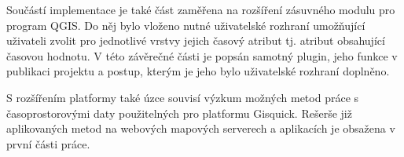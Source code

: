 Součástí implementace je také část zaměřena na rozšíření zásuvného modulu pro program QGIS. Do něj bylo vloženo nutné uživatelské rozhraní umožňující uživateli zvolit pro jednotlivé vrstvy jejich časový atribut tj. atribut obsahující časovou hodnotu. V této závěrečné části je popsán samotný plugin, jeho funkce v publikaci projektu a postup, kterým je jeho bylo uživatelské rozhraní doplněno. 

S rozšířením platformy také úzce souvisí výzkum možných metod práce s časoprostorovými daty použitelných pro platformu Gisquick. Rešerše již aplikovaných metod na webových mapových serverech a aplikacích je obsažena v první části práce. 

